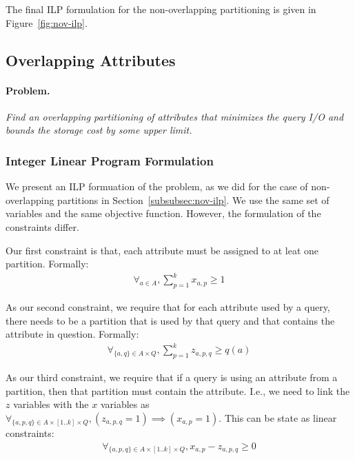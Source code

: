The final ILP formulation for the non-overlapping partitioning is given in
Figure~\ref{fig:nov-ilp}.


\subsection{Overlapping Attributes}

\paragraph*{Problem.$\,$} \emph{Find an overlapping partitioning of attributes
that minimizes the query I/O and bounds the storage cost by some upper
limit.}

\subsubsection{Integer Linear Program Formulation}
We present an ILP formuation of the problem, as we did for the case of
non-overlapping partitions in Section~\ref{subsubsec:nov-ilp}. We use the same
set of variables and the same objective function. However, the formulation of
the constraints differ. 

Our first constraint is that, each attribute must be assigned to at leat one
partition. Formally:
\begin{eqnarray}
\forall_{a\in A}, \sum_{p=1}^{k} x_{a,p} \geq 1
\end{eqnarray}

As our second constraint, we require that for each attribute used by a query,
there needs to be a partition that is used by that query and that contains the
attribute in question. Formally:
\begin{eqnarray}
\forall_{\{a,q\}\in A\times Q}, \sum_{p=1}^{k} z_{a,p,q} \geq q(a) 
\end{eqnarray}

\begin{sloppypar}
As our third constraint, we require that if a query is using an attribute from
a partition, then that partition must contain the attribute. I.e., we need
to link the $z$ variables with the $x$ variables as
$\forall_{\{a,p,q\}\in A\times [1..k]\times Q}, (z_{a,p,q} = 1) \implies 
(x_{a,p} = 1)$. This can be state as linear constraints:
\begin{eqnarray}
\forall_{\{a,p,q\}\in A\times [1..k]\times Q}, x_{a,p} - z_{a,p,q} \geq 0 
\end{eqnarray}
\end{sloppypar}

